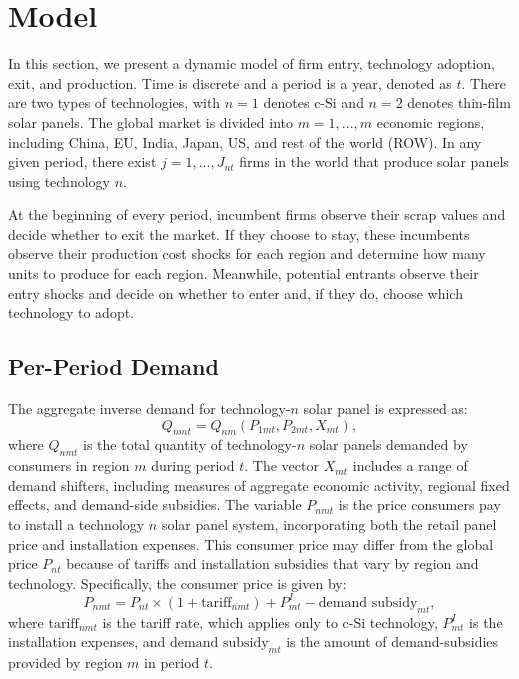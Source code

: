 \documentclass[12pt, letter]{article}
\begin{document}
\newpage


\section{Model}
In this section, we present a dynamic model of firm entry, technology adoption, exit, and production. Time is discrete and a period is a year, denoted as $t$. There are two types of technologies, with $n=1$ denotes c-Si and $n=2$ denotes thin-film solar panels. The global market is divided into $m=1,...,m$ economic regions, including China, EU, India, Japan, US, and rest of the world (ROW). In any given period, there exist $j = 1,...,J_{nt}$ firms in the world that produce solar panels using technology $n$. 

At the beginning of every period, incumbent firms observe their scrap values and decide whether to exit the market. If they choose to stay, these incumbents observe their production cost shocks for each region and determine how many units to produce for each region. Meanwhile, potential entrants observe their entry shocks and decide on whether to enter and, if they do, choose which technology to adopt. 



\subsection{Per-Period Demand}

The aggregate inverse demand for technology-$n$ solar panel is expressed as:
\begin{equation}
Q_{nmt}=Q_{nm}(P_{1mt},P_{2mt},X_{mt}), \label{eq:model_demand}
\end{equation}
where $Q_{nmt}$ is the total quantity of technology-$n$ solar panels demanded by consumers in region $m$ during period $t$. The vector $X_{mt}$ includes a range of demand shifters, including measures of aggregate economic activity, regional fixed effects, and demand-side subsidies. The variable $P_{nmt}$ is the price consumers pay to install a technology $n$ solar panel system, incorporating both the retail panel price and installation expenses. This consumer price may differ from the global price $P_{nt}$ because of tariffs and installation subsidies that vary by region and technology. Specifically, the consumer price is given by:
\[P_{nmt} = P_{nt}\times (1 + \text{tariff}_{nmt}) + P^{I}_{mt} - \text{demand subsidy}_{mt},\]
where $\text{tariff}_{nmt}$ is the tariff rate, which applies only to c-Si technology, $P^{I}_{mt}$ is the installation expenses, and $\text{demand subsidy}_{mt}$ is the amount of demand-subsidies provided by region $m$ in period $t$.
\end{document}
